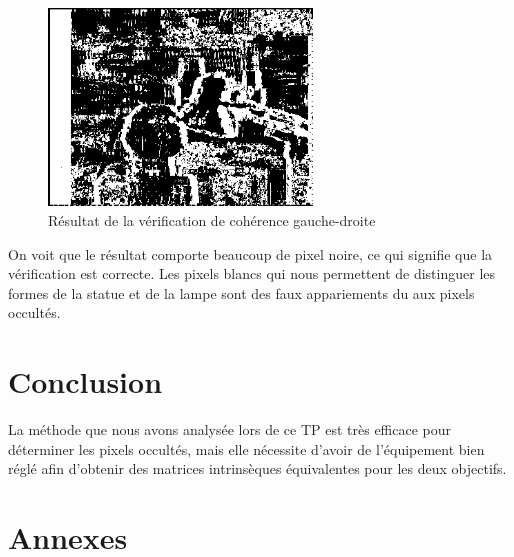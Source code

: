 \documentclass[a4paper,10pt]{article}
\begin{document}
\begin{figure}[!h]
 \centering
 \includegraphics[width=7cm]{validityMask.png}
 \caption{Résultat de la vérification de cohérence gauche-droite}
\end{figure}

On voit que le résultat comporte beaucoup de pixel noire, ce qui signifie que la vérification est correcte.
Les pixels blancs qui nous permettent de distinguer les formes de la statue et de la lampe sont des faux appariements
du aux pixels occultés.

\section{Conclusion}
La méthode que nous avons analysée lors de ce TP est très efficace pour déterminer les pixels occultés, mais elle nécessite
d'avoir de l'équipement bien réglé afin d'obtenir des matrices intrinsèques équivalentes pour les deux objectifs.
\newpage
\section{Annexes}
\end{document}
